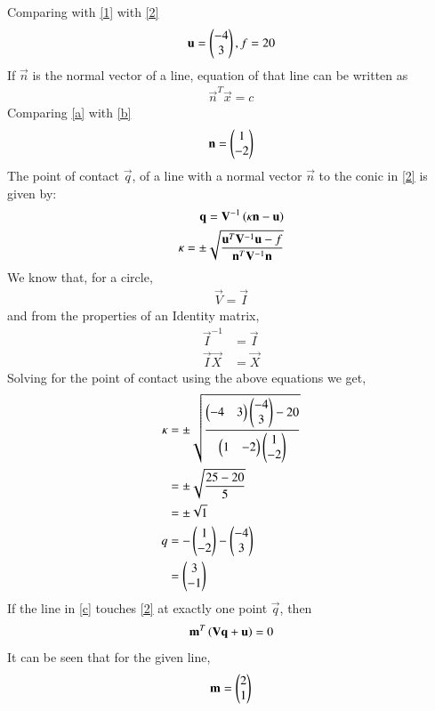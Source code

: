\documentclass[journal,12pt,twocolumn]{IEEEtran}
\begin{document}
Comparing  with \eqref{1} with \eqref{2}
\begin{align}
\mathbf{u}=\begin{pmatrix}-4 \\ 3\end{pmatrix}, f=20
\end{align}
If $\vec{n}$ is the normal vector of a line, equation of that line can be written as 
\begin{align}
\vec{n}^T\vec{x} = c \label{b}
\end{align}
Comparing \eqref{a} with \eqref{b}
\begin{align}
\mathbf{n} = \begin{pmatrix}1 \\ -2\end{pmatrix}
\end{align}
 The point of contact $\vec{q}$, of a line with a normal vector $\vec{n}$ to the conic in \eqref{2} is given by:
\begin{align}
\mathbf{q} = \mathbf{V}^{-1}\left(\kappa \mathbf{n}-\mathbf{u}\right) 
\\
\kappa = \pm \sqrt{\frac{\mathbf{u}^T\mathbf{V}^{-1}\mathbf{u}-f}{\mathbf{n}^T\mathbf{V}^{-1}\mathbf{n}}} 
\end{align}
We know that, for a circle, 
\begin{align}
\vec{V} = \vec{I}  
\end{align}
and from the properties of an Identity matrix, 
\begin{align}
\vec{I}^{-1} &= \vec{I} \\
\vec{I}\vec{X} &= \vec{X}   
\end{align}
Solving for the point of contact using the above equations we get,
\begin{align}
\kappa &= \pm \sqrt{\frac{\begin{pmatrix} -4 & 3 \end{pmatrix}\begin{pmatrix}-4 \\ 3\end{pmatrix} - 20}{\begin{pmatrix}1 & -2 \end{pmatrix}\begin{pmatrix}1 \\ -2 \end{pmatrix}}} \\
&= \pm \sqrt{\frac{25 - 20}{5}} \\
& =  \pm \sqrt{1} \\
q &= -\begin{pmatrix} 1\\-2 \end{pmatrix} - \begin{pmatrix}-4 \\ 3\end{pmatrix} \\
&= \begin{pmatrix}3 \\ -1\end{pmatrix}
\end{align}
If the line in \eqref{c} touches \eqref{2} at exactly one point $\vec{q}$, then 
\begin{align}
\mathbf{m}^T\left(\mathbf{V}\mathbf{q}+\mathbf{u}\right) = 0 \label{z}
\end{align}
It can be seen that for the given line,
\begin{align}
\mathbf{m} = \begin{pmatrix}2 \\ 1\end{pmatrix} 
\end{align}
\end{document}
